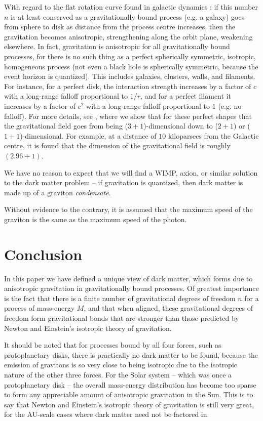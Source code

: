 \documentclass[12pt]{article}
\begin{document}
{With regard to the flat rotation curve found in galactic dynamics \cite{binney}: if this number $n$ is at least conserved as a gravitationally bound process (e.g. a galaxy) goes from sphere to disk as distance from the process centre increases, then the gravitation becomes anisotropic, strengthening along the orbit plane, weakening elsewhere.
In fact, gravitation is anisotropic for all gravitationally bound processes, for there is no such thing as a perfect spherically symmetric, isotropic, homogeneous process (not even a black hole is spherically symmetric, because the event horizon is quantized).
This includes galaxies, clusters, walls, and filaments.
For instance, for a perfect disk, the interaction strength increases by a factor of $c$ with a long-range falloff proportional to $1/r$, and for a perfect filament it increases by a factor of $c^2$ with a long-range falloff proportional to $1$ (e.g. no falloff).
For more details, see \cite{halayka}, where we show that for these perfect shapes that the gravitational field goes from being ($3+1$)-dimensional down to ($2+1$) or ($1+1$)-dimensional.
For example, at a distance of $10$ kiloparsecs from the Galactic centre, it is found that the dimension of the gravitational field is roughly $(2.96 + 1)$.

We have no reason to expect that we will find a WIMP, axion, or similar solution \cite{berger, aalbers, quiskamp, haipeng, hui, ackerman} to the dark matter problem -- if gravitation is quantized, then dark matter is made up of a graviton {\textit{condensate}}.

Without evidence to the contrary, it is assumed that the maximum speed of the graviton is the same as the maximum speed of the photon.






\section{Conclusion}

In this paper we have defined a unique view of dark matter, which forms due to anisotropic gravitation in gravitationally bound processes.
Of greatest importance is the fact that there is a finite number of gravitational degrees of freedom $n$ for a process of mass-energy $M$, and that when aligned, these gravitational degrees of freedom form gravitational bonds that are stronger than those predicted by Newton and Einstein's isotropic theory of gravitation.

It should be noted that for processes bound by all four forces, such as protoplanetary disks, there is practically no dark matter to be found, because the emission of gravitons is so very close to being isotropic due to the isotropic nature of the other three forces.
For the Solar system -- which was once a protoplanetary disk -- the overall mass-energy distribution has become too sparse to form any appreciable amount of anisotropic gravitation in the Sun.
This is to say that Newton and Einstein's isotropic theory of gravitation is still very great, for the AU-scale cases where dark matter need not be factored in.

}
\end{document}
